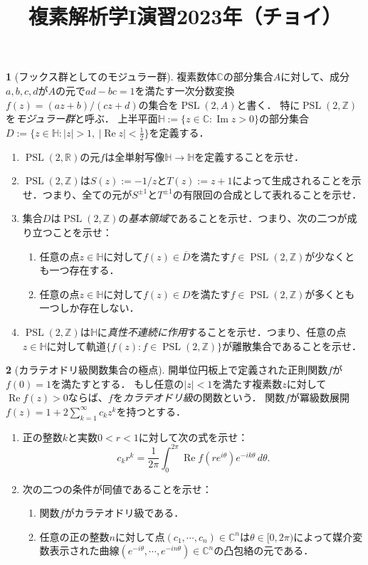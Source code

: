 \documentclass[a4paper]{article}
\theoremstyle{definition}
\newtheorem{prb}{}
\renewcommand{\Re}{\operatorname{Re}}
\renewcommand{\Im}{\operatorname{Im}}
\renewcommand{\H}{\mathbb{H}}
\newcommand{\C}{\mathbb{C}}
\newcommand{\R}{\mathbb{R}}
\newcommand{\Z}{\mathbb{Z}}
\newcommand{\PSL}{\operatorname{PSL}}
\renewcommand{\bar}{\overline}
\begin{document}
\title{複素解析学I演習2023年（チョイ）}
\date{}
\maketitle


\begin{prb}[フックス群としてのモジュラー群]
複素数体$\C$の部分集合$A$に対して、成分$a,b,c,d$が$A$の元で$ad-bc=1$を満たす一次分数変換$f(z)=(az+b)/(cz+d)$の集合を$\PSL(2,A)$と書く．
特に$\PSL(2,\Z)$を\emph{モジュラー群}と呼ぶ．
上半平面$\H:=\{z\in\C:\Im z>0\}$の部分集合$D:=\{z\in\H:|z|>1,\ |\Re z|<\frac12\}$を定義する．
\begin{enumerate}[label=(\arabic*)]
\item $\PSL(2,\R)$の元$f$は全単射写像$\H\to\H$を定義することを示せ．
\item $\PSL(2,\Z)$は$S(z):=-1/z$と$T(z):=z+1$によって生成されることを示せ．つまり、全ての元が$S^{\pm1}$と$T^{\pm1}$の有限回の合成として表れることを示せ．
\item 集合$D$は$\PSL(2,\Z)$の\emph{基本領域}であることを示せ．つまり、次の二つが成り立つことを示せ：
\begin{enumerate}[label=(\alph*)]
\item 任意の点$z\in\H$に対して$f(z)\in\bar D$を満たす$f\in\PSL(2,\Z)$が少なくとも一つ存在する．
\item 任意の点$z\in\H$に対して$f(z)\in D$を満たす$f\in\PSL(2,\Z)$が多くとも一つしか存在しない．
\end{enumerate}
\item $\PSL(2,\Z)$は$\H$に\emph{真性不連続に作用}することを示せ．つまり、任意の点$z\in\H$に対して軌道$\{f(z):f\in\PSL(2,\Z)\}$が離散集合であることを示せ．
\end{enumerate}
\end{prb}


\begin{prb}[カラテオドリ級関数集合の極点]
開単位円板上で定義された正則関数$f$が$f(0)=1$を満たすとする．
もし任意の$|z|<1$を満たす複素数$z$に対して$\Re f(z)>0$ならば、$f$を\emph{カラテオドリ級}の関数という．
関数$f$が冪級数展開$f(z)=1+2\sum_{k=1}^\infty c_kz^k$を持つとする．
\begin{enumerate}[label=(\arabic*)]
\item 正の整数$k$と実数$0<r<1$に対して次の式を示せ：
\[c_kr^k=\frac1{2\pi}\int_0^{2\pi}\Re f(re^{i\theta})e^{-ik\theta}\,d\theta.\]
\item 次の二つの条件が同値であることを示せ：
\begin{enumerate}[label=(\alph*)]
\item 関数$f$がカラテオドリ級である．
\item 任意の正の整数$n$に対して点$(c_1,\cdots,c_n)\in\C^n$は$\theta\in[0,2\pi)$によって媒介変数表示された曲線$(e^{-i\theta},\cdots,e^{-in\theta})\in\C^n$の凸包絡の元である．
\end{enumerate}
\end{enumerate}
\end{prb}
\end{document}
